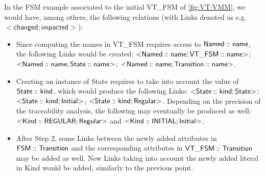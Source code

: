 In the \textsf{FSM} example associated to the initial \textsf{VT\_FSM} of \cref{fig:VT:VMM},
we would have, among others, the following relations (with \textsf{Link}s denoted 
as e.g.~$\mathsf{<} \mathsf{changed} ; \mathsf{impacted} \mathsf{>}$):
\begin{itemize}
	\item Since computing the \textsf{name}s in \textsf{VT\_FSM} requires access
	to $\mathsf{Named \,\colon\!\!\!\colon name}$, the following \textsf{Link}s would be
	created: 
	$\mathsf{<} \mathsf{Named \,\colon\!\!\!\colon name} ; \mathsf{VT\_FSM \,\colon\!\!\!\colon name} \mathsf{>}$;
	$\mathsf{<} \mathsf{Named \,\colon\!\!\!\colon name} ; \mathsf{State \,\colon\!\!\!\colon name} \mathsf{>}$;
	$\mathsf{<} \mathsf{Named \,\colon\!\!\!\colon name} ; \mathsf{Transition \,\colon\!\!\!\colon name} \mathsf{>}$.

	\item Creating an instance of \textsf{State} requires to take into account
	the value of $\mathsf{State \,\colon\!\!\!\colon kind}$, which would produce the following
	\textsf{Link}s: 
	$\mathsf{<} \mathsf{State \,\colon\!\!\!\colon kind} ; \mathsf{State} \mathsf{>}$;
	$\mathsf{<} \mathsf{State \,\colon\!\!\!\colon kind} ; \mathsf{Initial} \mathsf{>}$;
	$\mathsf{<} \mathsf{State \,\colon\!\!\!\colon kind} ; \mathsf{Regular} \mathsf{>}$.
	Depending on the precision of the traceability analysis, the following may
	eventually be produced as well: 
	$\mathsf{<} \mathsf{Kind \,\colon\!\!\!\colon REGULAR} ; \mathsf{Regular} \mathsf{>}$ and
	$\mathsf{<} \mathsf{Kind \,\colon\!\!\!\colon INITIAL} ; \mathsf{Initial} \mathsf{>}$.
	


	\item After Step 2, some \textsf{Link}s between the newly added attributes
	in $\mathsf{FSM \,\colon\!\!\!\colon Transition}$ and the corresponding attributes in 
	$\mathsf{VT\_FSM \,\colon\!\!\!\colon Transition}$ may be added as well. New 
	\textsf{Link}s taking into account the newly added literal in \textsf{Kind}
	would be added, similarly to the previous point.
\end{itemize}